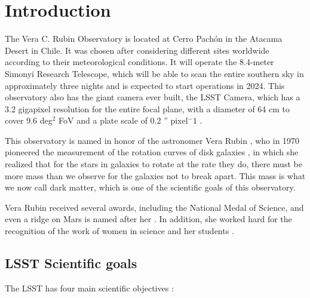 \section{Introduction} \label{sec:intro}


The Vera C. Rubin Observatory is located at Cerro Pachón in the Atacama Desert in Chile. It was chosen after considering different sites worldwide according to their meteorological conditions. It will operate the 8.4-meter Simonyi Research Telescope, which will be able to scan the entire southern sky in approximately three nights and is expected to start operations in 2024. This observatory also has the giant camera ever built, the LSST Camera, which has a 3.2 gigapixel resolution for the entire focal plane, with a diameter of 64 cm to cover 9.6 deg$^2$ FoV and a plate scale of 0.2 '' pixel$^-1$ \citep{2009arXiv0912.0201L}.

\vspace{3mm}

This observatory is named in honor of the astronomer Vera Rubin  \citep{NSF_2020}, who in 1970 pioneered the measurement of the rotation curves of disk galaxies \citep{rubin2011interesting}, in which she realized that for the stars in galaxies to rotate at the rate they do, there must be more mass than we observe for the galaxies not to break apart. This mass is what we now call dark matter, which is one of the scientific goals of this observatory. 

\vspace{3mm}

Vera Rubin received several awards, including the National Medal of Science, and even a ridge on Mars is named after her \citep{koren_2020}. In addition, she worked hard for the recognition of the work of women in science and her students \citep{rubin2011interesting}. 


\subsection{LSST Scientific goals}

The LSST has four main scientific objectives \citep{2009arXiv0912.0201L, ivezic2019lsst}:

